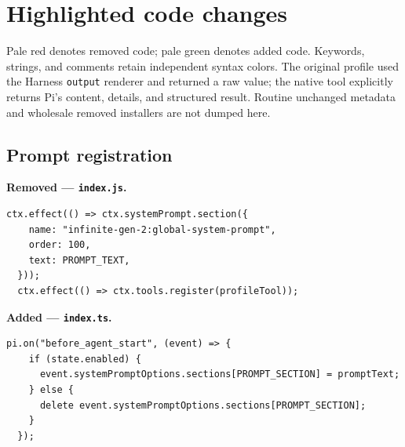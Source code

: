 \documentclass[10pt]{ltjsarticle}
\begin{document}
\section{Highlighted code changes}
Pale red denotes removed code; pale green denotes added code. Keywords,
strings, and comments retain independent syntax colors. The original profile
used the Harness \texttt{output} renderer and returned a raw value; the native
tool explicitly returns Pi's content, details, and structured result. Routine
unchanged metadata and wholesale removed installers are not dumped here.
\subsection{Prompt registration}
\noindent\textbf{Removed --- \texttt{index.js}.}\par\smallskip
\begin{lstlisting}[backgroundcolor=\color{RemovedBg},firstnumber=128]
  ctx.effect(() => ctx.systemPrompt.section({
    name: "infinite-gen-2:global-system-prompt",
    order: 100,
    text: PROMPT_TEXT,
  }));
  ctx.effect(() => ctx.tools.register(profileTool));
\end{lstlisting}
\noindent\textbf{Added --- \texttt{index.ts}.}\par\smallskip
\begin{lstlisting}[backgroundcolor=\color{AddedBg},firstnumber=112]
  pi.on("before_agent_start", (event) => {
    if (state.enabled) {
      event.systemPromptOptions.sections[PROMPT_SECTION] = promptText;
    } else {
      delete event.systemPromptOptions.sections[PROMPT_SECTION];
    }
  });
\end{lstlisting}
\end{document}

